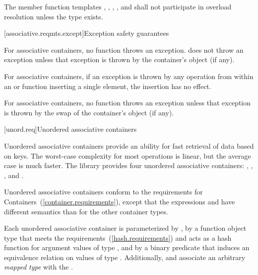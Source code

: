 \pnum
The member function templates , , ,
, and  shall not participate in overload
resolution unless the type  exists.

%
%
[associative.reqmts.except]{Exception safety guarantees}

\pnum
For associative containers, no  function throws an exception.
 does not throw an exception unless that exception is thrown
by the container's  object (if any).

\pnum
For associative containers, if an exception is thrown by any operation from
within an  or  function inserting a single element, the
insertion has no effect.

\pnum
For associative containers, no  function throws an exception unless
that exception is thrown by the
swap of the container's  object (if any).

[unord.req]{Unordered associative containers}

\pnum
{}%
Unordered associative containers provide an ability for fast retrieval
of data based on keys.  The worst-case complexity for most operations
is linear, but the average case is much faster.  The library provides
four unordered associative containers: ,
, , and
.

\pnum
{}%
%
%
Unordered associative containers conform to the requirements for
Containers~(\ref{container.requirements}), except that
the expressions
 and  have different semantics than for the other
container types.

\pnum
Each unordered associative container is parameterized by ,
by a function object type  that meets the 
requirements~(\ref{hash.requirements}) and acts as a hash function for
argument values of type , and by a binary predicate 
that induces an equivalence relation on values of type .
Additionally,  and  associate
an arbitrary \textit{mapped type}  with the .


